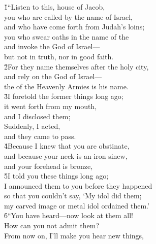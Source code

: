 \begin{poetry}
\poeml {}
\v{1}``Listen to this, house of Jacob, \\
\poemll    you who are called by the name of Israel, \\
\poemlll       and who have come forth from Judah's loins; \\
\poeml you who swear oaths in the name of the  \\
\poemll    and invoke the God of Israel--- \\
\poemlll       but not in truth, nor in good faith. \\
\poeml \v{2}For they name themselves after the holy city, \\
\poemll    and rely on the God of Israel--- \\
\poemlll       the  of the Heavenly Armies is his name. \\
\poeml \v{3}I foretold the former things long ago; \\
\poemll    it went forth from my mouth, \\
\poemlll       and I disclosed them; \\
\poeml Suddenly, I acted, \\
\poemll    and they came to pass. \\
\poeml \v{4}Because I knew that you are obstinate, \\
\poemll    and because your neck is an iron sinew, \\
\poemlll       and your forehead is bronze, \\
\poeml \v{5}I told you these things long ago; \\
\poemll    I announced them to you before they happened \\
\poeml so that you couldn't say, `My idol did them; \\
\poemll    my carved image or metal idol ordained them.' \\
\poeml \v{6}``You have heard---now look at them all! \\
\poemll    How can you not admit them? \\
\poeml From now on, I'll make you hear new things, \\

\end{poetry}
